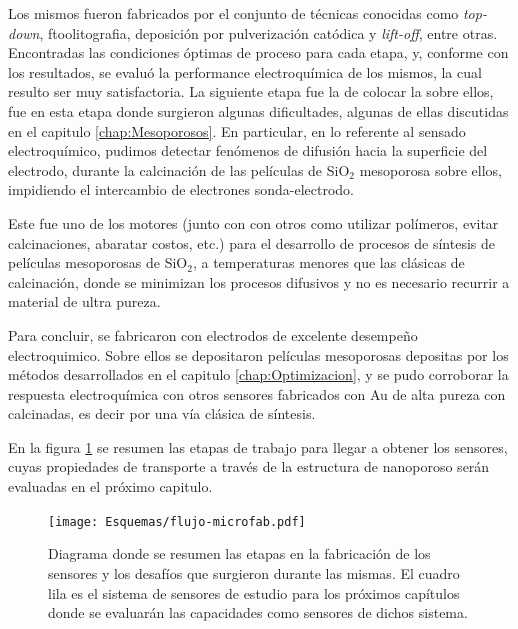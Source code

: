 	Los mismos fueron fabricados por el conjunto de técnicas conocidas como \textit{top-down}, ftoolitografia, deposición por
	pulverización catódica y \textit{lift-off}, entre otras. Encontradas las condiciones óptimas de proceso para cada etapa, y, conforme con los resultados, se evaluó la performance electroquímica de los mismos, la cual resulto ser muy satisfactoria. La siguiente etapa fue la de	colocar la \pdm\space sobre ellos, fue en esta etapa donde surgieron algunas dificultades, algunas de ellas discutidas en el capitulo \ref{chap:Mesoporosos}. En particular, en lo referente al sensado electroquímico, pudimos detectar fenómenos de difusión hacia la superficie del electrodo, durante la calcinación de las películas de SiO$_2$ mesoporosa sobre ellos, impidiendo el intercambio de electrones sonda-electrodo. 

	Este fue uno de los motores (junto con con otros como utilizar polímeros, evitar calcinaciones, abaratar costos, etc.) para el desarrollo de procesos de síntesis de películas mesoporosas de SiO$_2$, a temperaturas menores que las clásicas de calcinación, donde se minimizan los procesos difusivos y no es necesario recurrir a material de ultra pureza.
	
	Para concluir, se fabricaron con electrodos de excelente desempeño electroquimico. Sobre ellos se depositaron películas mesoporosas depositas por los métodos desarrollados en el capitulo \ref{chap:Optimizacion}, y se pudo corroborar la respuesta electroquímica con otros sensores fabricados con Au de alta pureza con \pdm\space calcinadas, es decir por una vía clásica de síntesis.

	En la figura \ref{fig:flujo-microfab} se resumen las etapas de trabajo para llegar a obtener los sensores, cuyas propiedades de transporte a través de la estructura de nanoporoso serán evaluadas en el próximo capitulo.
				
				\newpage
				
				\begin{figure}[ht!]
		 	       	\texttt{[image: Esquemas/flujo-microfab.pdf]}
		        	\caption[Fabricación de sensores, flujo de procesos.]{Diagrama donde se resumen las etapas en la fabricación de los sensores y los desafíos que surgieron durante las mismas. El cuadro lila es el sistema de sensores de estudio para los próximos capítulos donde se evaluarán las capacidades como sensores de dichos sistema.}
		         	\label{fig:flujo-microfab}
		     		\end{figure}


